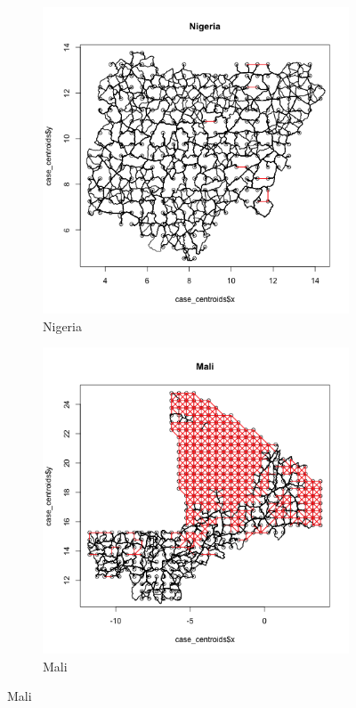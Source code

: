 \documentclass[11pt, oneside]{article}   	%
\begin{document}
\begin{figure}[t]
\centering
\caption{Road Networks for Different Countries as Scanned off OSM}

\begin{subfigure}[c]{0.43\textwidth}
\includegraphics[width=\textwidth, trim={1cm 1cm 0cm 2cm},clip]{../../Build/output/Road_Networks/network_Nigeria.png}
\caption{Nigeria}
\label{fig:nigeria_roads}
\end{subfigure}
\begin{subfigure}[c]{0.43\textwidth}
\includegraphics[width=\textwidth, trim={1cm 1cm 0cm 2cm},clip]{../../Build/output/Road_Networks/network_Mali.png}
\caption{Mali}
\label{fig:Mali_roads}
\end{subfigure}


\end{figure}
\end{document}
